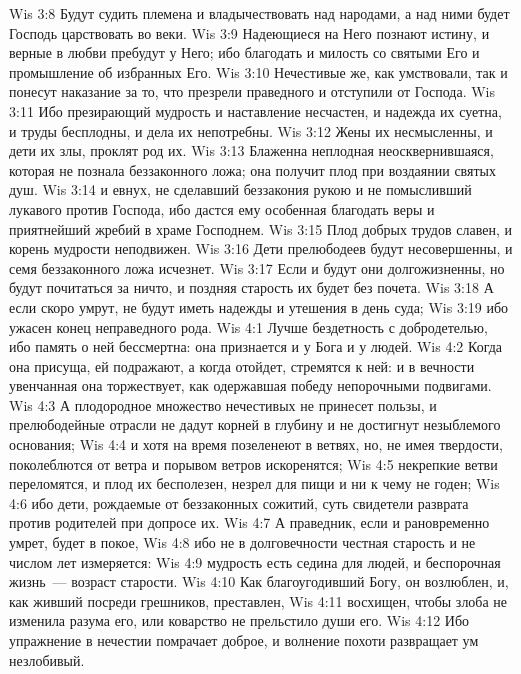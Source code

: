 \vs Wis 3:8 Будут судить племена и владычествовать над народами, а над ними будет Господь царствовать во веки.
\vs Wis 3:9 Надеющиеся на Него познают истину, и верные в любви пребудут у Него; ибо благодать и милость со святыми Его и промышление об избранных Его.
\vs Wis 3:10 Нечестивые же, как умствовали, так и понесут наказание за то, что презрели праведного и отступили от Господа.
\vs Wis 3:11 Ибо презирающий мудрость и наставление несчастен, и надежда их суетна, и труды бесплодны, и дела их непотребны.
\vs Wis 3:12 Жены их несмысленны, и дети их злы, проклят род их.
\vs Wis 3:13 Блаженна неплодная неосквернившаяся, которая не познала беззаконного ложа; она получит плод при воздаянии святых душ.
\vs Wis 3:14  и евнух, не сделавший беззакония рукою и не помысливший лукавого против Господа, ибо дастся ему особенная благодать веры и приятнейший жребий в храме Господнем.
\vs Wis 3:15 Плод добрых трудов славен, и корень мудрости неподвижен.
\vs Wis 3:16 Дети прелюбодеев будут несовершенны, и семя беззаконного ложа исчезнет.
\vs Wis 3:17 Если и будут они долгожизненны, но будут почитаться за ничто, и поздняя старость их будет без почета.
\vs Wis 3:18 А если скоро умрут, не будут иметь надежды и утешения в день суда;
\vs Wis 3:19 ибо ужасен конец неправедного рода.
\vs Wis 4:1 Лучше бездетность с добродетелью, ибо память о ней бессмертна: она признается и у Бога и у людей.
\vs Wis 4:2 Когда она присуща, ей подражают, а когда отойдет, стремятся к ней: и в вечности увенчанная она торжествует, как одержавшая победу непорочными подвигами.
\vs Wis 4:3 А плодородное множество нечестивых не принесет пользы, и прелюбодейные отрасли не дадут корней в глубину и не достигнут незыблемого основания;
\vs Wis 4:4 и хотя на время позеленеют в ветвях, но, не имея твердости, поколеблются от ветра и порывом ветров искоренятся;
\vs Wis 4:5 некрепкие ветви переломятся, и плод их  бесполезен, незрел для пищи и ни к чему не годен;
\vs Wis 4:6 ибо дети, рождаемые от беззаконных сожитий, суть свидетели разврата против родителей при допросе их.
\vs Wis 4:7 А праведник, если и рановременно умрет, будет в покое,
\vs Wis 4:8 ибо не в долговечности честная старость и не числом лет измеряется:
\vs Wis 4:9 мудрость есть седина для людей, и беспорочная жизнь~--- возраст старости.
\vs Wis 4:10 Как благоугодивший Богу, он возлюблен, и, как живший посреди грешников, преставлен,
\vs Wis 4:11 восхищен, чтобы злоба не изменила разума его, или коварство не прельстило души его.
\vs Wis 4:12 Ибо упражнение в нечестии помрачает доброе, и волнение похоти развращает ум незлобивый.
